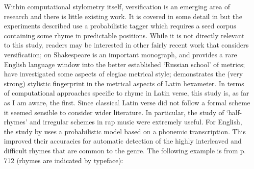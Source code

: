 \documentclass[twocolumn, switch, a4paper]{article} %
\begin{document}
Within computational stylometry itself, versification is an emerging area of
research and there is little existing work. It is covered in some detail in
 but the experiments described use a
probabilistic tagger which requires a seed corpus containing some rhyme in
predictable positions. While it is not directly relevant to this study,
readers may be interested in other fairly recent work that considers
versification;  on Shakespeare is
an important monograph, and provides a rare English language window into the
better established  `Russian school' of metrics;
 have investigated some aspects of elegiac
metrical style;  demonstrates the (very strong)
stylistic fingerprint in the metrical aspects of Latin hexameter. In terms of
computational approaches specific to rhyme in Latin verse, this study is, as
far as I am aware, the first. Since classical Latin verse did not follow a
formal scheme it seemed sensible to consider wider literature. In particular,
the study of `half-rhymes' and irregular schemes in rap music were extremely
useful. For English, the study by  uses a
probabilistic model based on a phonemic transcription. This improved their
accuracies for automatic detection of the highly interleaved and difficult
rhymes that are common to the genre. The following example is from p. 712
(rhymes are indicated by typeface):
\end{document}
